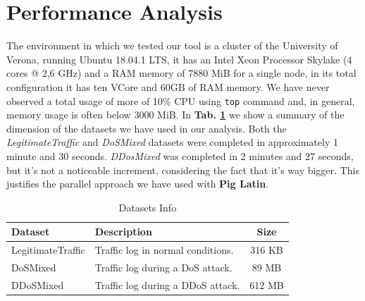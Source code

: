 \section{Performance Analysis}
\label{sec:perfanalysis}
The environment in which we tested our tool is a cluster of the University of Verona, running Ubuntu 18.04.1 LTS, it has an Intel Xeon Processor Skylake (4 cores @ 2,6 GHz) and a RAM memory of 7880 MiB for a single node, in its total configuration it has ten VCore and 60GB of RAM memory. 
We have never observed a total usage of more of 10\% CPU using \texttt{top} command and, in general, memory usage is often below 3000 MiB.
%
In \textbf{Tab. \ref{tab:dataset_info}} we show a summary of the dimension of the datasets we have used in our analysis. Both the \textit{LegitimateTraffic} and \textit{DoSMixed} datasets were completed in approximately 1 minute and 30 seconds. \textit{DDosMixed} was completed in 2 minutes and 27 seconds, but it's not a noticeable increment, considering the fact that it's way bigger. This justifies the parallel approach we have used with \textbf{Pig Latin}.

\begin{table}[!htbp]
\centering
\begin{tabular}{|l|l|c|}
\hline
\textbf{Dataset} & \textbf{Description}                              & \textbf{Size} \\ \hline
LegitimateTraffic         & Traffic log in normal conditions. & 316 KB        \\ 
DoSMixed        & Traffic log during a DoS attack.                   & 89 MB       \\ 
DDoSMixed        & Traffic log during a DDoS attack. & 612 MB        \\ \hline
\end{tabular}
\caption{Datasets Info}
\label{tab:dataset_info}
\end{table}
